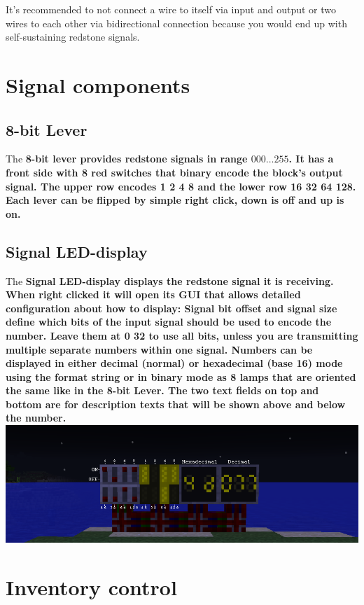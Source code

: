 \documentclass[11pt]{article} %
\begin{document}
It's recommended to not connect a wire to itself via input and output or two wires to each other via bidirectional connection because you would end up with self-sustaining redstone signals.

\section{Signal components}
\subsection{8-bit Lever}
The \bf 8-bit lever \rm provides redstone signals in range $000\dots255$. It has a front side with 8 red switches that binary encode the block's output signal. The upper row encodes 1 2 4 8 and the lower row 16 32 64 128. Each lever can be flipped by simple right click, down is off and up is on.

\subsection{Signal LED-display}
The \bf Signal LED-display \rm displays the redstone signal it is receiving. When right clicked it will open its GUI that allows detailed configuration about how to display:
Signal bit offset and signal size define which bits of the input signal should be used to encode the number. Leave them at 0 32 to use all bits, unless you are transmitting multiple separate numbers within one signal. Numbers can be displayed in either decimal (normal) or hexadecimal (base 16) mode using the format string or in binary mode as 8 lamps that are oriented the same like in the 8-bit Lever.
The two text fields on top and bottom are for description texts that will be shown above and below the number.
\includegraphics[width=\textwidth]{8_bit_io}\\

\section{Inventory control}
\end{document}
